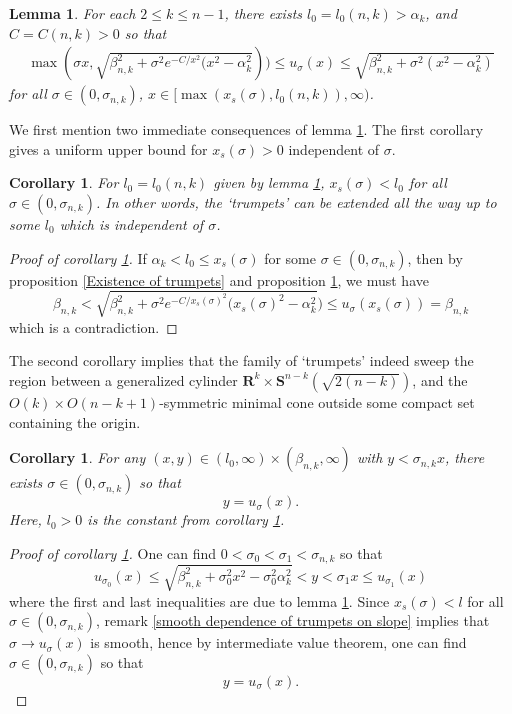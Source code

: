 \documentclass[pdflatex,sn-mathphys-num]{sn-jnl}
\newtheorem{lemma}[theorem]{Lemma}
\newtheorem{corollary}[theorem]{Corollary}
\begin{document}
\begin{lemma}\label{Alternative $C^0$ for trumpets}
For each $2 \leq k \leq n-1$, there exists $l_0 = l_0(n,k) > \alpha_k$, and $C = C(n,k) > 0$ so that 
   \begin{align*}
       \max(\sigma x, \sqrt{\beta_{n,k}^2 + \sigma^2e^{-C/x^2}(x^2 - \alpha_k^2})) \leq u_{\sigma}(x) \leq  \sqrt{\beta_{n,k}^2 + \sigma^2(x^2 - \alpha_k^2)}
   \end{align*}
for all $\sigma \in (0, \sigma_{n,k})$, $x \in [\max(x_{s}(\sigma),l_0(n,k)), \infty)$.
\end{lemma}
We first mention two immediate consequences of lemma \ref{Alternative $C^0$ for trumpets}. The first corollary gives a uniform upper bound for $x_{s}(\sigma) > 0$ independent of $\sigma$.
\begin{corollary}\label{Upper bound of starting point for trumpets}
    For $l_0 = l_0(n,k)$ given by lemma \ref{Alternative $C^0$ for trumpets}, $x_{s}(\sigma) < l_0$ for all $\sigma \in (0, \sigma_{n,k})$. In other words, the `trumpets' can be extended all the way up to some $l_0$ which is independent of $\sigma$.
\end{corollary}
\begin{proof}[Proof of corollary \ref{Upper bound of starting point for trumpets}]
   If $\alpha_k < l_0 \leq x_s(\sigma)$ for some $\sigma \in (0, \sigma_{n,k})$, then by proposition \ref{Existence of trumpets} and proposition \ref{Alternative $C^0$ for trumpets}, we must have
   \begin{equation}
        \beta_{n,k} < \sqrt{\beta^2_{n,k} + \sigma^2e^{-C/x_s(\sigma)^2}(x_s(\sigma)^2 - \alpha_k^2})\leq u_{\sigma}(x_s(\sigma)) = \beta_{n,k}
   \end{equation}
   which is a contradiction.
\end{proof}
The second corollary implies that the family of `trumpets' indeed sweep the region between a generalized cylinder $\mathbf{R}^k\times \mathbf{S}^{n-k}(\sqrt{2(n-k)})$, and the $O(k)\times O(n-k+1)$-symmetric minimal cone outside some compact set containing the origin.
\begin{corollary}\label{Sweeping out by trumpets}
For any $(x, y) \in (l_0, \infty) \times (\beta_{n,k}, \infty)$ with $y < \sigma_{n,k}x$, there exists $\sigma \in (0, \sigma_{n,k})$ so that
    $$y = u_{\sigma}(x).$$
    Here, $l_0 > 0$ is the constant from corollary \ref{Upper bound of starting point for trumpets}. 
\end{corollary}
\begin{proof}[Proof of corollary \ref{Sweeping out by trumpets}]
    One can find $0 < \sigma_0 < \sigma_1 < \sigma_{n,k}$ so that
    $$ u_{\sigma_0}(x) \leq\sqrt{\beta_{n,k}^2 +  \sigma_0^2x^2- \sigma_0^2\alpha_k^2} < y < \sigma_1x \leq u_{\sigma_1}(x)$$
    where the first and last inequalities are due to lemma \ref{Alternative $C^0$ for trumpets}. 
    Since $x_{s}(\sigma) < l$ for all $\sigma \in (0, \sigma_{n,k})$, remark \ref{smooth dependence of trumpets on slope} implies that $\sigma \to u_{\sigma}(x)$ is smooth, hence by intermediate value theorem, one can find $\sigma \in (0, \sigma_{n,k})$ so that $$y=u_{\sigma}(x).$$
\end{proof}
\end{document}
